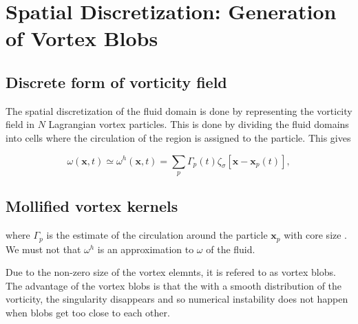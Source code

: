 

\section{Spatial Discretization: Generation of Vortex Blobs}


\subsection{Discrete form of vorticity field}
The spatial discretization of the fluid domain is done by representing the vorticity field in $N$ Lagrangian vortex particles. This is done by dividing the fluid domains into cells where the circulation of the region is assigned to the particle. This gives 

\begin{equation}
\omega\left(\mathbf{x},t\right) \simeq \omega^h\left(\mathbf{x},t\right) = \sum_{p}\Gamma_p\left(t\right)\zeta_{\sigma}\left[\mathbf{x}-\mathbf{x}_p\left(t\right)\right],
\end{equation}

\subsection{Mollified vortex kernels}

where $\Gamma_p$  is the estimate of the circulation around the particle $\mathbf{x}_p$  with core size . We must not that $\omega^h$ is an approximation to $\omega$ of the fluid.

Due to the non-zero size of the vortex elemnts, it is refered to as vortex blobs. The advantage of the vortex blobs is that the with a smooth distribution of the vorticity, the singularity disappears and so numerical instability does not happen when blobs get too close to each other. 

